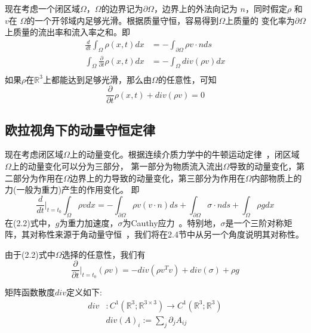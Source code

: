 现在考虑一个闭区域$\Omega$，$\Omega$的边界记为$\partial \Omega$，边界上的外法向记为
$n$，同时假定$\rho$ 和 $v$在 $\Omega$的一个开邻域内足够光滑。根据质量守恒，容易得到$\Omega$上质量的
变化率为$\partial \Omega$上质量的流出率和流入率之和。即
\begin{equation}
    \begin{split}
        \frac{d}{dt}\int_{\Omega} \rho(x,t)dx &= -\int_{\partial \Omega} \rho v \cdot n ds \\
        \int_{\Omega} \frac{\partial}{\partial t} \rho (x,t)dx &= -\int_{\Omega} div(\rho v)dx\nonumber\\
    \end{split}
\end{equation}
如果$\rho$在$\mathbb{R}^3$上都能达到足够光滑，那么由$\Omega$的任意性，可知
\begin{equation}
    \frac{\partial}{\partial t}\rho (x,t) + div(\rho v) = 0
\end{equation}

\subsection{欧拉视角下的动量守恒定律}
现在考虑闭区域$\Omega$上的动量变化。根据连续介质力学中的牛顿运动定律~\cite{gonzalez2008first}，闭区域$\Omega$上的动量变化可以分为三部分，
第一部分为物质流入流出$\Omega$导致的动量变化，第二部分为作用在$\Omega$边界上的力导致的动量变化，第三部分为作用在$\Omega$内部物质上的力(一般为重力)产生的作用变化。
即
\begin{equation}
    \frac{d}{dt} \Big |_{t = t_0} \int_{\Omega} \rho v dx = -\int_{\partial \Omega} \rho v (v\cdot n) ds + \int_{\partial \Omega} \sigma \cdot n ds + \int_{\Omega} \rho g dx
\end{equation}
在(2.2)式中，$g$为重力加速度，$\sigma$为Cauthy应力~\cite{gonzalez2008first}。特别地，$\sigma$是一个三阶对称矩阵，其对称性来源于角动量守恒~\cite{marsden1994mathematical}，我们将在2.4节中从另一个角度说明其对称性。

由于(2.2)式中$\Omega$选择的任意性，我们有
\begin{equation}
    \frac{\partial}{\partial t} \Big |_{t = t_0}(\rho v) = -div(\rho v^{T}v) + div(\sigma) + \rho g
\end{equation}

矩阵函数散度$div$定义如下:
\begin{equation}
    \begin{split}
        div &: C^1(\mathbb{R}^3;\mathbb{R}^{3\times 3}) \rightarrow C^1(\mathbb{R}^3;\mathbb{R}^3)\\
        &div(A)_i := \sum_j \partial_j A_{ij}\nonumber\\
    \end{split}
\end{equation}

